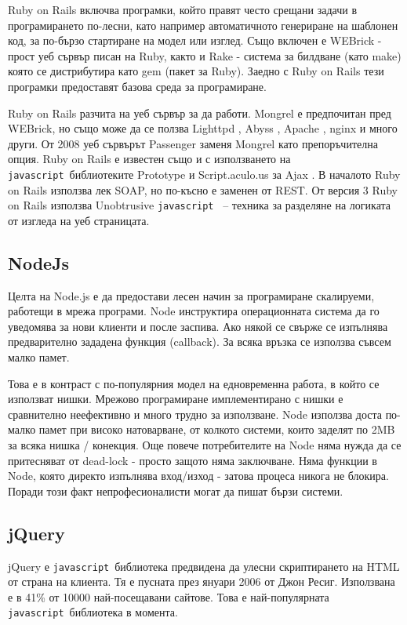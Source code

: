 \documentclass[a4paper]{article}
\def\js{\texttt{javascript}}
\begin{document}
  Ruby on Rails включва програмки, който правят често срещани задачи в програмирането по-лесни, като например автоматичното генериране на шаблонен код, за по-бързо стартиране на модел или изглед. Също включен е WEBrick - прост уеб сървър писан на Ruby, както и Rake - система за билдване (като make) която се дистрибутира като gem (пакет за Ruby). Заедно с Ruby on Rails тези програмки предоставят базова среда за програмиране.

  Ruby on Rails разчита на уеб сървър за да работи. Mongrel е предпочитан пред WEBrick, но също може да се ползва Lighttpd \cite{lighttpd}, Abyss \cite{abyss}, Apache \cite{apache}, nginx \cite{nginx} и много други. От 2008 уеб сървърът Passenger \cite{passenger} заменя Mongrel като препоръчителна опция.
  Ruby on Rails е известен също и с използването на \js\ библиотеките Prototype \cite{prototype} и Script.aculo.us за Ajax \cite{ajax}. В началото Ruby on Rails използва лек SOAP, но по-късно е заменен от REST. От версия 3 Ruby on Rails използва Unobtrusive \js\ \cite{unobtrusive} -- техника за разделяне на логиката от изгледа на уеб страницата.

  \subsection{NodeJs}
  Целта на Node.js \cite{node} е да предостави лесен начин за програмиране скалируеми, работещи в мрежа програми. Node инструктира операционната система да го уведомява за нови клиенти и после заспива. Ако някой се свърже се изпълнява предварително зададена функция (callback). За всяка връзка се използва съвсем малко памет.

  Това е в контраст с по-популярния модел на едновременна работа, в който се използват нишки. Мрежово програмиране имплементирано с нишки е сравнително неефективно и много трудно за използване. Node използва доста по-малко памет при високо натоварване, от колкото системи, които заделят по 2MB за всяка нишка / конекция. Още повече потребителите на Node няма нужда да се притесняват от dead-lock - просто защото няма заключване. Няма функции в Node, която директо изпълнява вход/изход - затова процеса никога не блокира. Поради този факт непрофесионалисти могат да пишат бързи системи.
    
  \subsection{jQuery}
  jQuery \cite{jquery} е \js\ библиотека предвидена да улесни скриптирането на HTML от страна на клиента. Тя е пусната през януари 2006 от Джон Ресиг. Използвана е в 41\% от 10000 най-посещавани сайтове. Това е най-популярната \js\ библиотека в момента.
\end{document}
